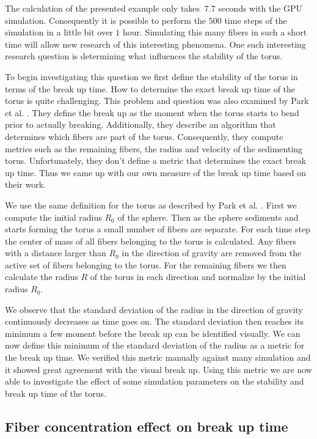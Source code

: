 \documentclass[a4paper,11pt]{kth-mag}
\begin{document}
The calculation of the presented example only takes $~7.7$ seconds with the GPU simulation. Consequently it is possible to perform the $500$ time steps of the simulation in a little bit over $1$ hour. Simulating this many fibers in such a short time will allow new research of this interesting phenomena. One such interesting research question is determining what influences the stability of the torus. 

To begin investigating this question we first define the stability of the torus in terms of the break up time. How to determine the exact break up time of the torus is quite challenging. This problem and question was also examined by Park et al. \cite{Park2010}. They define the break up as the moment when the torus starts to bend prior to actually breaking. Additionally, they describe an algorithm that determines which fibers are part of the torus. Consequently, they compute metrics such as the remaining fibers, the radius and velocity of the sedimenting torus. Unfortunately, they don't define a metric that determines the exact break up time. Thus we came up with our own measure of the break up time based on their work.

We use the same definition for the torus as described by Park et al. \cite{Park2010}. First we compute the initial radius $R_0$ of the sphere. Then as the sphere sediments and starts forming the torus a small number of fibers are separate. For each time step the center of mass of all fibers belonging to the torus is calculated. Any fibers with a distance larger than $R_0$ in the direction of gravity are removed from the active set of fibers belonging to the torus. For the remaining fibers we then calculate the radius $R$ of the torus in each direction and normalize by the initial radius $R_0$.

We observe that the standard deviation of the radius in the direction of gravity continuously decreases as time goes on. The standard deviation then reaches its minimum a few moment before the break up can be identified visually. We can now define this minimum of the standard deviation of the radius as a metric for the break up time. We verified this metric manually against many simulation and it showed great agreement with the visual break up. Using this metric we are now able to investigate the effect of some simulation parameters on the stability and break up time of the torus.

\subsection{Fiber concentration effect on break up time}
\end{document}
